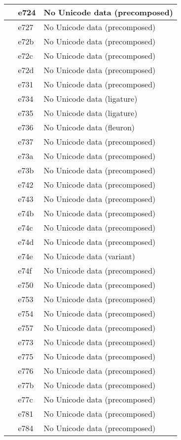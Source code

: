 \documentclass[12pt,letterpaper,openany]{book}
\begin{document}
\begin{center}
\begin{supertabular}{|m{0.25in}|m{0.5in}|m{4in}|}
 & e724 & No Unicode data (precomposed)\\\hline
 & e727 & No Unicode data (precomposed)\\\hline
 & e72b & No Unicode data (precomposed)\\\hline
 & e72c & No Unicode data (precomposed)\\\hline
 & e72d & No Unicode data (precomposed)\\\hline
 & e731 & No Unicode data (precomposed)\\\hline
 & e734 & No Unicode data (ligature)\\\hline
 & e735 & No Unicode data (ligature)\\\hline
 & e736 & No Unicode data (fleuron)\\\hline
 & e737 & No Unicode data (precomposed)\\\hline
 & e73a & No Unicode data (precomposed)\\\hline
 & e73b & No Unicode data (precomposed)\\\hline
 & e742 & No Unicode data (precomposed)\\\hline
 & e743 & No Unicode data (precomposed)\\\hline
 & e74b & No Unicode data (precomposed)\\\hline
 & e74c & No Unicode data (precomposed)\\\hline
 & e74d & No Unicode data (precomposed)\\\hline
 & e74e & No Unicode data (variant)\\\hline
 & e74f & No Unicode data (precomposed)\\\hline
 & e750 & No Unicode data (precomposed)\\\hline
 & e753 & No Unicode data (precomposed)\\\hline
 & e754 & No Unicode data (precomposed)\\\hline
 & e757 & No Unicode data (precomposed)\\\hline
 & e773 & No Unicode data (precomposed)\\\hline
 & e775 & No Unicode data (precomposed)\\\hline
 & e776 & No Unicode data (precomposed)\\\hline
 & e77b & No Unicode data (precomposed)\\\hline
 & e77c & No Unicode data (precomposed)\\\hline
 & e781 & No Unicode data (precomposed)\\\hline
 & e784 & No Unicode data (precomposed)\\\hline

\end{supertabular}
\end{center}
\end{document}
